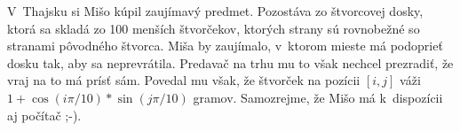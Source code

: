 V~Thajsku si Mišo kúpil zaujímavý predmet. Pozostáva zo štvorcovej dosky, ktorá sa skladá zo 100 menších štvorčekov,
ktorých strany sú rovnobežné so stranami pôvodného štvorca. Miša by zaujímalo, v~ktorom mieste má podoprieť dosku tak, aby sa neprevrátila.
Predavač na trhu mu to však nechcel prezradiť, že vraj na to má prísť sám. Povedal mu však, že štvorček na pozícii $[i,j]$ váži
$1+\cos(i\pi/10)*\sin(j\pi/10)$ gramov. Samozrejme, že Mišo má k~dispozícii aj počítač ;-).
